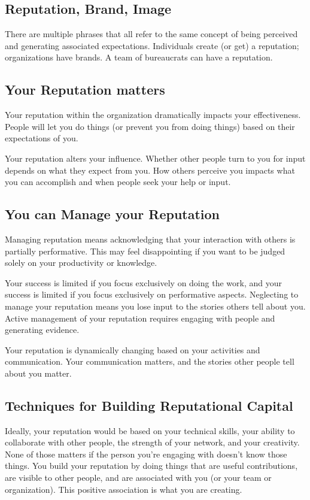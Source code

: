 \subsection*{Reputation, Brand, Image}

There are multiple phrases that all refer to the same concept of being perceived and generating associated expectations. Individuals create (or get) a reputation; organizations have brands. A team of bureaucrats can have a reputation. 

\subsection*{Your Reputation matters}

Your reputation within the organization dramatically impacts your effectiveness. People will let you do things (or prevent you from doing things) based on their expectations of you. 

Your reputation alters your influence. Whether other people turn to you for input depends on what they expect from you. How others perceive you impacts what you can accomplish and when people seek your help or input.

\subsection*{You can Manage your Reputation}

Managing reputation means acknowledging that your interaction with others is partially performative. This may feel disappointing if you want to be judged solely on your productivity or knowledge. 

Your success is limited if you focus exclusively on doing the work, and your success is limited if you focus exclusively on performative aspects. 
Neglecting to manage your reputation means you lose input to the stories others tell about you. Active management of your reputation requires engaging with people and generating evidence. 

Your reputation is dynamically changing based on your activities and communication. Your communication matters, and the stories other people tell about you matter.

\subsection*{Techniques for Building Reputational Capital}

Ideally, your reputation would be based on your technical skills, your ability to collaborate with other people, the strength of your network, and your creativity. None of those matters if the person you're engaging with doesn't know those things. 
You build your reputation by doing things that are useful contributions, are visible to other people, and are associated with you (or your team or organization). This positive association is what you are creating.

